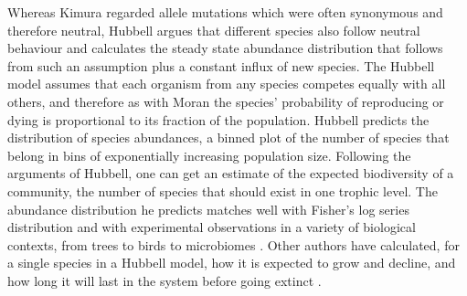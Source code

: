 Whereas Kimura regarded allele mutations which were often synonymous and therefore neutral, Hubbell argues that different species also follow neutral behaviour and calculates the steady state abundance distribution that follows from such an assumption plus a constant influx of new species. %
The Hubbell model assumes that each organism from any species competes equally with all others, and therefore as with Moran the species' probability of reproducing or dying is proportional to its fraction of the population.
Hubbell predicts the distribution of species abundances, a binned plot of the number of species that belong in bins of exponentially increasing population size. 
Following the arguments of Hubbell, one can get an estimate of the expected biodiversity of a community, the number of species that should exist in one trophic level. 
The abundance distribution he predicts matches well with Fisher's log series distribution \cite{Fisher1943,McKane2003} and with experimental observations in a variety of biological contexts, from trees to birds to microbiomes \cite{Hubbell2001}. 
Other authors have calculated, for a single species in a Hubbell model, how it is expected to grow and decline, and how long it will last in the system before going extinct \cite{Azaele2006,Leigh2007,Pigolotti2013,Kalyuzhny2014}. 

